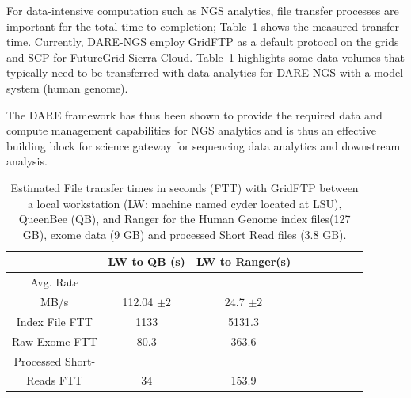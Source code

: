 \documentclass[]{svjour3}
\begin{document}
For data-intensive computation such as NGS analytics, file transfer
processes are important for the total time-to-completion;
Table~\ref{table:NGS-Distributed-file} shows the measured transfer
time. Currently, DARE-NGS employ GridFTP as a default protocol on the
grids and SCP for FutureGrid Sierra Cloud.
Table~\ref{table:NGS-Distributed-file} highlights some data volumes
that typically need to be transferred with data analytics for DARE-NGS
with a model system (human genome).

The DARE framework has thus been shown to provide the required data
and compute management capabilities for NGS analytics and is thus an
effective building block for science gateway for sequencing data
analytics and downstream analysis.

 \begin{table}
\centering
 \small
 \begin{tabular}{|c|c|c|c|c|c|c|c|c|} 
 \hline  
 	          & LW to QB (s)  & LW to Ranger(s) \\
 \hline                       
Avg. Rate && \\
MB/s & 112.04 $\pm 2$ &	    24.7 $\pm 2$  \\
 \hline                       
Index File	FTT & 1133  &	    5131.3      \\        
 \hline                       
Raw 	 Exome FTT&80.3 & 363.6\\                  
 \hline                       
Processed Short-&    & \\
Reads FTT&34&153.9  \\
 \hline                       
\end{tabular}
\caption{Estimated File transfer times in seconds (FTT) with GridFTP
  between a local workstation (LW; machine named cyder located at
  LSU), QueenBee (QB), and Ranger for the Human Genome index files(127
  GB), exome data (9 GB) and processed Short Read files (3.8 GB).}

 \label{table:NGS-Distributed-file} 
\end{table}
\end{document}
